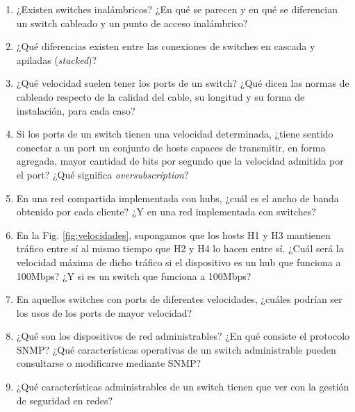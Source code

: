 \begin{enumerate}
\item ¿Existen switches inalámbricos? ¿En qué se parecen y en qué se diferencian un switch cableado y un punto de acceso inalámbrico? 
\item ¿Qué diferencias existen entre las conexiones de switches en cascada y apiladas (\emph{stacked})? 
\item ¿Qué velocidad suelen tener los ports de un switch? ¿Qué dicen las normas de cableado respecto de la calidad del cable, su longitud y su forma de instalación, para cada caso?
\item Si los ports de un switch tienen una velocidad determinada, ¿tiene sentido conectar a un port un conjunto de hosts capaces de transmitir, en forma agregada, mayor cantidad de bits por segundo que la velocidad admitida por el port? ¿Qué significa \emph{oversubscription}?
\item En una red compartida implementada con hubs, ¿cuál es el ancho de banda obtenido por cada cliente? ¿Y en una red implementada con switches?

\item En la Fig. \ref{fig:velocidades}, supongamos que los hosts H1 y H3 mantienen tráfico entre sí al mismo tiempo que H2 y H4 lo hacen entre sí. ¿Cuál será la velocidad máxima de dicho tráfico si el dispositivo es un hub que funciona a 100Mbps? ¿Y si es un switch que funciona a 100Mbps? 

\item En aquellos switches con ports de diferentes velocidades, ¿cuáles podrían ser los usos de los ports de mayor velocidad?
\item ¿Qué son los dispositivos de red administrables? ¿En qué consiste el protocolo SNMP? ¿Qué características operativas de un switch administrable pueden consultarse o modificarse mediante SNMP? 
\item ¿Qué características administrables de un switch tienen que ver con la gestión de seguridad en redes?
\end{enumerate}






